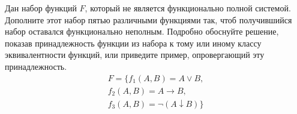 \question
Дан набор функций $F$, который не является функционально полной системой. Дополните этот набор пятью различными функциями так, чтоб получившийся набор оставался функционально неполным. Подробно обоснуйте решение, показав  принадлежность функции из набора к тому или иному классу эквивалентности функций, или приведите пример, опровергающий эту принадлежность.    
\begin{gather*}
F = \{f_1(A,B) = A \lor B, \\
f_2(A,B) = A \to B, \\
f_3(A,B) = \neg(A \downarrow B)\}
\end{gather*}
